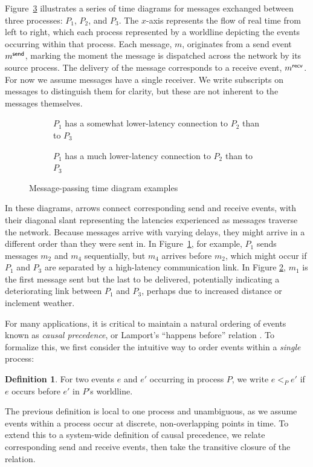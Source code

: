 \documentclass[]             %
{NASA}                       %
\theoremstyle{definition}
\newtheorem{definition}[theorem]{Definition}
\begin{document}
Figure~\ref{fig:message-latencies} illustrates a series of time
diagrams for messages exchanged between three processes: $P_1$, $P_2$,
and $P_3$. The $x$-axis represents the flow of real time from left to
right, which each process represented by a worldline depicting the
events occurring within that process. Each message, $m$, originates
from a send event $m_{}^{\mathsf{send}}$, marking the moment the message is
dispatched across the network by its source process. The delivery of
the message corresponds to a receive event, $m_{}^{\mathsf{recv}}$. For now we
assume messages have a single receiver. We write subscripts on
messages to distinguish them for clarity, but these are not inherent
to the messages themselves.

\begin{figure}[p]
  \setlength\belowcaptionskip{5ex}
  \begin{subfigure}{1\textwidth}
    \centering
    
    \caption{$P_1$ has a somewhat lower-latency connection to $P_2$ than to $P_3$}
    \label{fig:message-latencies-a}
  \end{subfigure}
  \begin{subfigure}{1\textwidth}
    \centering 
    \caption{$P_1$ has a much lower-latency connection to $P_2$ than to $P_3$}
    \label{fig:message-latencies-b}
  \end{subfigure}
  \caption{Message-passing time diagram examples}
  \label{fig:message-latencies}
\end{figure}

In these diagrams, arrows connect corresponding send and receive
events, with their diagonal slant representing the latencies
experienced as messages traverse the network. Because messages arrive
with varying delays, they might arrive in a different order than they
were sent in. In Figure~\ref{fig:message-latencies-a}, for example,
$P_1$ sends messages $m_2$ and $m_4$ sequentially, but $m_4$ arrives
before $m_2$, which might occur if $P_1$ and $P_3$ are separated by a
high-latency communication link. In Figure
\ref{fig:message-latencies-b}, $m_1$ is the first message sent but the
last to be delivered, potentially indicating a deteriorating link
between $P_1$ and $P_3$, perhaps due to increased distance or
inclement weather.

For many applications, it is critical to maintain a natural ordering
of events known as \emph{causal precedence}, or Lamport's ``happens
before'' relation \cite{1978:lamportclocks}. To formalize this, we
first consider the intuitive way to order events within a
\emph{single} process:
\begin{definition}
  For two events $e$ and $e'$ occurring in process $P$, we
  write $e <_{P} e'$ if $e$ occurs before $e'$ in $P$'s
  worldline.
\end{definition}
The previous definition is local to one process and unambiguous, as we
assume events within a process occur at discrete, non-overlapping
points in time. To extend this to a system-wide definition of causal
precedence, we relate corresponding send and receive events, then take
the transitive closure of the relation.
\end{document}
